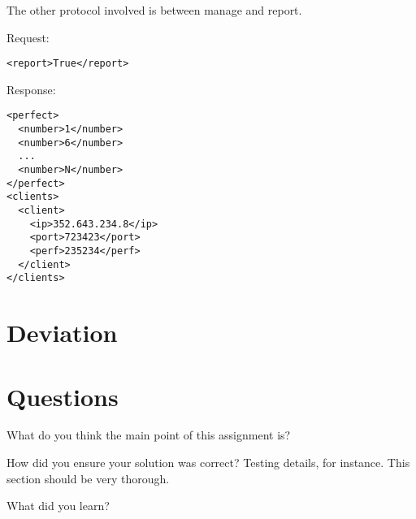 \documentclass[letterpaper,10pt]{article}
\begin{document}
The other protocol involved is between manage and report.

Request:
\begin{verbatim}
<report>True</report>
\end{verbatim}

Response:
\begin{verbatim}
<perfect>
  <number>1</number>
  <number>6</number>
  ...
  <number>N</number>
</perfect>
<clients>
  <client>
    <ip>352.643.234.8</ip>
    <port>723423</port>
    <perf>235234</perf>
  </client>
</clients>
\end{verbatim}

\section{Deviation}

\section{Questions}
\begin{description}
  \item  What do you think the main point of this assignment is?

  \item  How did you ensure your solution was correct? Testing details, for
         instance. This section should be very thorough.

  \item  What did you learn?

\end{description}

\newpage


%
\end{document}

